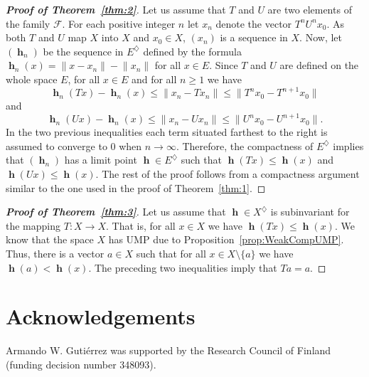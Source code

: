 \documentclass[a4paper,12pt]{article}
\theoremstyle{definition}
\numberwithin{equation}{section}
\newcommand{\norm}[1]{\lVert#1\rVert} %
\newcommand{\F}{\mathcal{F}} %
\numberwithin{equation}{section}
\DeclareMathOperator{\h}{\mathbf{h}} %
\begin{document}
\begin{proof} 
[\bf{Proof of Theorem~{\upshape\ref{thm:2}}}]
Let us assume that $T$ and $U$ are two 
elements of the family $\F$. For each 
positive integer $n$ let $x_n$ denote the 
vector $T^{n}U^{n}x_0$. As both $T$ and 
$U$ map $X$ into $X$ and $x_0\in X$, 
$(x_{n})$ is a sequence in $X$. Now, let 
$(\h_n)$ be the sequence in 
$E^\diamondsuit$ defined by the formula
$\h_n(x)=\norm{x - x_{n}}-\norm{x_{n}}$ for 
all $x\in E$. Since $T$ and $U$ are defined
on the whole space $E$, for all $x\in E$ and
for all $n\geq 1$ we have
$$ 
\h_n(Tx) - \h_n(x) 
    \leq \norm{x_{n} - Tx_{n}}
    \leq \norm{T^{n}x_0 - T^{n+1}x_0} 
$$
and 
$$ 
\h_n(Ux) - \h_n(x) 
    \leq \norm{x_{n} - Ux_{n}}
    \leq \norm{U^{n}x_0 - U^{n+1}x_0}. 
$$
In the two previous inequalities each term 
situated farthest to the right is assumed to
converge to $0$ when $n\to\infty$. Therefore,
the compactness of $E^\diamondsuit$ implies 
that $(\h_n)$ has a limit point 
$\h\in E^\diamondsuit$ such that 
$\h(Tx)\leq \h(x)$ and $\h(Ux)\leq\h(x)$. 
The rest of the proof follows from a 
compactness argument similar to the one used 
in the proof of Theorem~\ref{thm:1}.
\end{proof}

\begin{proof} 
[\bf{Proof of Theorem~{\upshape\ref{thm:3}}}]
Let us assume that $\h\in X^\diamondsuit$ is 
subinvariant for the mapping $T:X\to X$. That 
is, for all $x\in X$ we have 
$\h(Tx) \leq \h(x)$. We know that the space 
$X$ has UMP due to 
Proposition~\ref{prop:WeakCompUMP}. Thus, 
there is a vector $a\in X$ such that for all 
$x\in X\setminus\{a\}$ we have 
$\h(a) < \h(x)$. The preceding two 
inequalities imply that $Ta=a$.
\end{proof}

\section{Acknowledgements}
Armando W. Guti\'{e}rrez was supported by the 
Research Council of Finland 
(funding decision number 348093).


\end{document}
